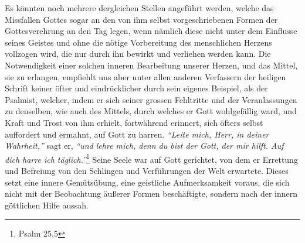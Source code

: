 Es könnten noch mehrere dergleichen Stellen
angeführt werden, welche das
Missfallen Gottes sogar an den von ihm selbst vorgeschriebenen Formen der
Gottesverehrung an den Tag legen, wenn nämlich diese nicht
unter dem Einflusse seines Geistes und ohne die nötige Vorbereitung des
menschlichen Herzens vollzogen wird, die nur durch ihn bewirkt und verliehen
werden kann. Die Notwendigkeit einer solchen inneren Bearbeitung unserer Herzen,
und das Mittel, sie zu erlangen, empfiehlt
uns aber unter allen anderen Verfassern der heiligen Schrift keiner öfter und
eindrücklicher durch sein eigenes Beispiel, als der
Psalmist, welcher, indem
er sich seiner grossen Fehltritte und der Veranlassungen zu denselben, wie auch
des Mittels, durch welches er Gott wohlgefällig ward, und Kraft und Trost von
ihm erhielt, fortwährend erinnert, sich öfters selbst auffordert und ermahnt,
auf Gott zu harren.
\textit{"`Leite mich, Herr, in deiner Wahrheit,"'}  sagt er,
\textit{"`und lehre mich, denn du bist der Gott, der mir hilft. Auf dich harre
ich täglich."'}\footnote{Psalm 25,5}
Seine Seele war auf Gott gerichtet, von dem er
Errettung und Befreiung von den Schlingen und Verführungen der Welt erwartete.
Dieses setzt eine innere Gemütsübung, eine geistliche Aufmerksamkeit voraus,
die sich nicht mit der Beobachtung äußerer Formen beschäftigte, sondern nach
der innern göttlichen Hilfe aussah.

\medskip

